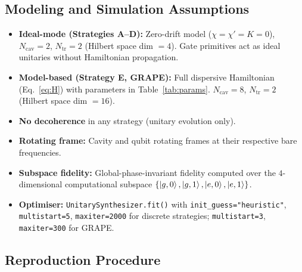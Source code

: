 \documentclass[aps,pra,twocolumn,reprint,floatfix,amsmath,amssymb]{revtex4-2}
\begin{document}
\subsection{Modeling and Simulation Assumptions}

\begin{itemize}
  \item \textbf{Ideal-mode (Strategies A--D):} Zero-drift model
    ($\chi=\chi'=K=0$), $N_\mathrm{cav}=2$, $N_\mathrm{tr}=2$
    (Hilbert space dim $=4$).  Gate primitives act as ideal
    unitaries without Hamiltonian propagation.
  \item \textbf{Model-based (Strategy E, GRAPE):} Full dispersive
    Hamiltonian (Eq.~\ref{eq:H}) with parameters in
    Table~\ref{tab:params}.  $N_\mathrm{cav}=8$, $N_\mathrm{tr}=2$
    (Hilbert space dim $=16$).
  \item \textbf{No decoherence} in any strategy (unitary evolution
    only).
  \item \textbf{Rotating frame:} Cavity and qubit rotating frames
    at their respective bare frequencies.
  \item \textbf{Subspace fidelity:} Global-phase-invariant fidelity
    computed over the $4$-dimensional computational subspace
    $\{\ket{g,0},\ket{g,1},\ket{e,0},\ket{e,1}\}$.
  \item \textbf{Optimiser:} \texttt{UnitarySynthesizer.fit()} with
    \texttt{init\_guess="heuristic"}, \texttt{multistart=5},
    \texttt{maxiter=2000} for discrete strategies;
    \texttt{multistart=3}, \texttt{maxiter=300} for GRAPE.
\end{itemize}

\subsection{Reproduction Procedure}
\end{document}
